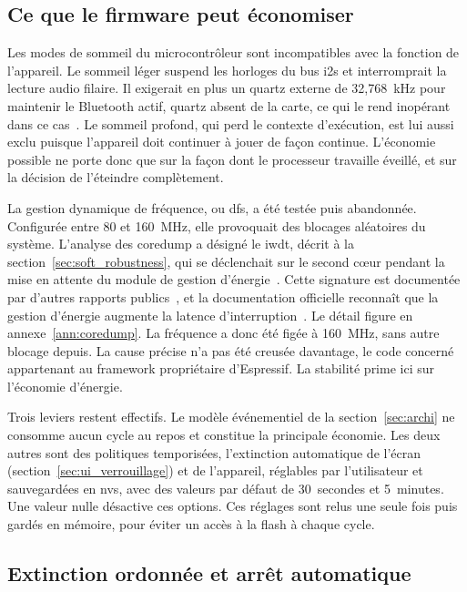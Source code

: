 \subsection{Ce que le firmware peut économiser}

Les modes de sommeil du microcontrôleur sont incompatibles avec la fonction de l'appareil. Le sommeil léger suspend les horloges du bus \gls{i2s} et interromprait la lecture audio filaire. Il exigerait en plus un quartz externe de 32,768~kHz pour maintenir le Bluetooth actif, quartz absent de la carte, ce qui le rend inopérant dans ce cas~\cite{ESP32_IDF_pm}. Le sommeil profond, qui perd le contexte d'exécution, est lui aussi exclu puisque l'appareil doit continuer à jouer de façon continue. L'économie possible ne porte donc que sur la façon dont le processeur travaille éveillé, et sur la décision de l'éteindre complètement.

La gestion dynamique de fréquence, ou \gls{dfs}, a été testée puis abandonnée. Configurée entre 80 et 160~MHz, elle provoquait des blocages aléatoires du système. L'analyse des \gls{coredump} a désigné le \gls{iwdt}, décrit à la section~\ref{sec:soft_robustness}, qui se déclenchait sur le second cœur pendant la mise en attente du module de gestion d'énergie~\cite{ESP32_IDF_wdt}. Cette signature est documentée par d'autres rapports publics~\cite{espressif_issue_2542, esp32_forum_wdt_pm}, et la documentation officielle reconnaît que la gestion d'énergie augmente la latence d'interruption~\cite{ESP32_IDF_pm}. Le détail figure en annexe~\ref{ann:coredump}. La fréquence a donc été figée à 160~MHz, sans autre blocage depuis. La cause précise n'a pas été creusée davantage, le code concerné appartenant au framework propriétaire d'Espressif. La stabilité prime ici sur l'économie d'énergie.

Trois leviers restent effectifs. Le modèle événementiel de la section~\ref{sec:archi} ne consomme aucun cycle au repos et constitue la principale économie. Les deux autres sont des politiques temporisées, l'extinction automatique de l'écran (section~\ref{sec:ui_verrouillage}) et de l'appareil, réglables par l'utilisateur et sauvegardées en \gls{nvs}, avec des valeurs par défaut de 30~secondes et 5~minutes. Une valeur nulle désactive ces options. Ces réglages sont relus une seule fois puis gardés en mémoire, pour éviter un accès à la flash à chaque cycle.

\subsection{Extinction ordonnée et arrêt automatique}

